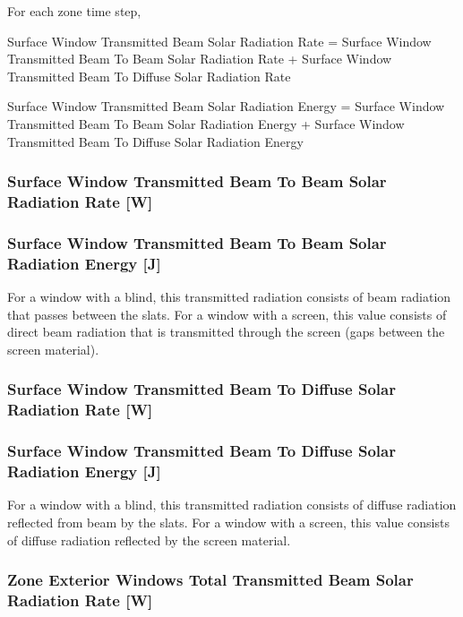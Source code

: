 For each zone time step,

Surface Window Transmitted Beam Solar Radiation Rate = Surface Window Transmitted Beam To Beam Solar Radiation Rate + Surface Window Transmitted Beam To Diffuse Solar Radiation Rate

Surface Window Transmitted Beam Solar Radiation Energy = Surface Window Transmitted Beam To Beam Solar Radiation Energy + Surface Window Transmitted Beam To Diffuse Solar Radiation Energy

\subsubsection{Surface Window Transmitted Beam To Beam Solar Radiation Rate {[}W{]}}\label{surface-window-transmitted-beam-to-beam-solar-radiation-rate-w}

\subsubsection{Surface Window Transmitted Beam To Beam Solar Radiation Energy {[}J{]}}\label{surface-window-transmitted-beam-to-beam-solar-radiation-energy-j}

For a window with a blind, this transmitted radiation consists of beam radiation that passes between the slats. For a window with a screen, this value consists of direct beam radiation that is transmitted through the screen (gaps between the screen material).

\subsubsection{Surface Window Transmitted Beam To Diffuse Solar Radiation Rate {[}W{]}}\label{surface-window-transmitted-beam-to-diffuse-solar-radiation-rate-w}

\subsubsection{Surface Window Transmitted Beam To Diffuse Solar Radiation Energy {[}J{]}}\label{surface-window-transmitted-beam-to-diffuse-solar-radiation-energy-j}

For a window with a blind, this transmitted radiation consists of diffuse radiation reflected from beam by the slats. For a window with a screen, this value consists of diffuse radiation reflected by the screen material.

\subsubsection{Zone Exterior Windows Total Transmitted Beam Solar Radiation Rate {[}W{]}}\label{zone-exterior-windows-total-transmitted-beam-solar-radiation-rate-w}

